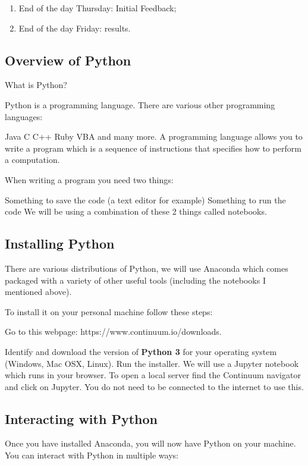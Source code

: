 \documentclass[11pt]{article}
\providecommand{\tightlist}{%
      \setlength{\itemsep}{0pt}\setlength{\parskip}{0pt}}
\begin{document}
\begin{enumerate}
\def\labelenumi{\arabic{enumi}.}
\tightlist
\item
  End of the day Thursday: Initial Feedback;
\item
  End of the day Friday: results.
\end{enumerate}

\subsection{Overview of Python}\label{overview-of-python}

What is Python?

Python is a programming language. There are various other programming
languages:

Java C C++ Ruby VBA and many more. A programming language allows you to
write a program which is a sequence of instructions that specifies how
to perform a computation.

When writing a program you need two things:

Something to save the code (a text editor for example) Something to run
the code We will be using a combination of these 2 things called
notebooks.

\subsection{Installing Python}\label{installing-python}

There are various distributions of Python, we will use Anaconda which
comes packaged with a variety of other useful tools (including the
notebooks I mentioned above).

To install it on your personal machine follow these steps:

Go to this webpage: https://www.continuum.io/downloads.

Identify and download the version of \textbf{Python 3} for your
operating system (Windows, Mac OSX, Linux). Run the installer. We will
use a Jupyter notebook which runs in your browser. To open a local
server find the Continuum navigator and click on Jupyter. You do not
need to be connected to the internet to use this.

\subsection{Interacting with Python}\label{interacting-with-python}

Once you have installed Anaconda, you will now have Python on your
machine. You can interact with Python in multiple ways:
\end{document}
